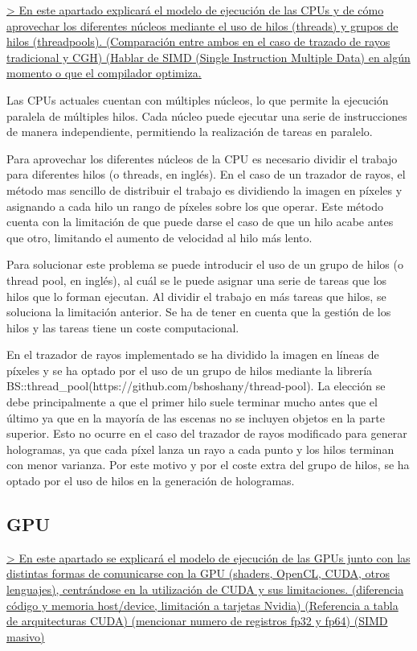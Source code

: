 \documentclass[10pt, a4paper]{article}
\begin{document}
\underline{> En este apartado explicará el modelo de ejecución de las CPUs y de cómo aprovechar los diferentes núcleos mediante el uso de hilos (threads) y grupos de hilos (threadpools). (Comparación entre ambos en el caso de trazado de rayos tradicional y CGH) (Hablar de SIMD (Single Instruction Multiple Data) en algún momento o que el compilador optimiza.}

Las CPUs actuales cuentan con múltiples núcleos, lo que permite la ejecución paralela de múltiples hilos. Cada núcleo puede ejecutar una serie de instrucciones de manera independiente, permitiendo la realización de tareas en paralelo.

Para aprovechar los diferentes núcleos de la CPU es necesario dividir el trabajo para diferentes hilos (o threads, en inglés). En el caso de un trazador de rayos, el método mas sencillo de distribuir el trabajo es dividiendo la imagen en píxeles y asignando a cada hilo un rango de píxeles sobre los que operar. Este método cuenta con la limitación de que puede darse el caso de que un hilo acabe antes que otro, limitando el aumento de velocidad al hilo más lento. 

Para solucionar este problema se puede introducir el uso de un grupo de hilos (o thread pool, en inglés), al cuál se le puede asignar una serie de tareas que los hilos que lo forman ejecutan. Al dividir el trabajo en más tareas que hilos, se soluciona la limitación anterior. Se ha de tener en cuenta que la gestión de los hilos y las tareas tiene un coste computacional.

En el trazador de rayos implementado se ha dividido la imagen en líneas de píxeles y se ha optado por el uso de un grupo de hilos mediante la librería BS::thread\_pool(https://github.com/bshoshany/thread-pool). La elección se debe principalmente a que el primer hilo suele terminar mucho antes que el último ya que en la mayoría de las escenas no se incluyen objetos en la parte superior. Esto no ocurre en el caso del trazador de rayos modificado para generar hologramas, ya que cada píxel lanza un rayo a cada punto y los hilos terminan con menor varianza. Por este motivo y por el coste extra del grupo de hilos, se ha optado por el uso de hilos en la generación de hologramas.

\subsection{GPU}

\underline{> En este apartado se explicará el modelo de ejecución de las GPUs junto con las distintas formas de comunicarse con la GPU (shaders, OpenCL, CUDA, otros lenguajes), centrándose en la utilización de CUDA y sus limitaciones. (diferencia código y memoria host/device, limitación a tarjetas Nvidia) (Referencia a tabla de arquitecturas CUDA) (mencionar numero de registros fp32 y fp64) (SIMD masivo)}
\end{document}
